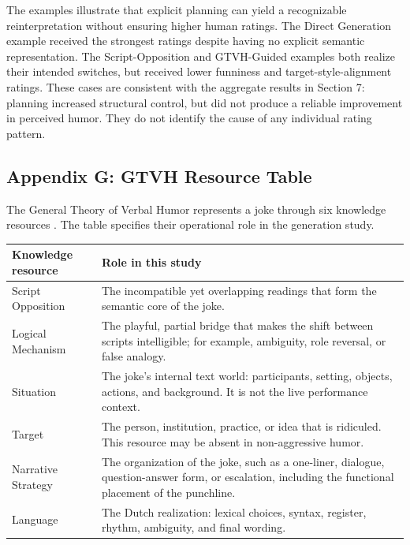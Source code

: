 \documentclass[11pt]{article}
\begin{document}
The examples illustrate that explicit planning can yield a recognizable reinterpretation without ensuring higher human ratings. The Direct Generation example received the strongest ratings despite having no explicit semantic representation. The Script-Opposition and GTVH-Guided examples both realize their intended switches, but received lower funniness and target-style-alignment ratings. These cases are consistent with the aggregate results in Section 7: planning increased structural control, but did not produce a reliable improvement in perceived humor. They do not identify the cause of any individual rating pattern.

\subsection{Appendix G: GTVH Resource Table}\label{appendix-g-gtvh-resource-table}

The General Theory of Verbal Humor represents a joke through six knowledge resources \citep{attardo1991}. The table specifies their operational role in the generation study.

\begin{table}[t]\centering\scriptsize\begin{tabularx}{\textwidth}{YY}
\toprule\noalign{}
Knowledge resource & Role in this study \\
\midrule\noalign{}

\bottomrule\noalign{}

Script Opposition & The incompatible yet overlapping readings that form the semantic core of the joke. \\
Logical Mechanism & The playful, partial bridge that makes the shift between scripts intelligible; for example, ambiguity, role reversal, or false analogy. \\
Situation & The joke's internal text world: participants, setting, objects, actions, and background. It is not the live performance context. \\
Target & The person, institution, practice, or idea that is ridiculed. This resource may be absent in non-aggressive humor. \\
Narrative Strategy & The organization of the joke, such as a one-liner, dialogue, question-answer form, or escalation, including the functional placement of the punchline. \\
Language & The Dutch realization: lexical choices, syntax, register, rhythm, ambiguity, and final wording. \\
\end{tabularx}\end{table}
\end{document}
